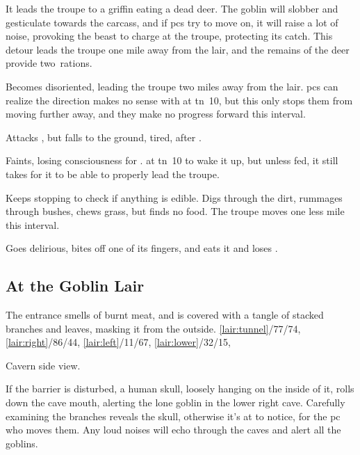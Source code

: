 \documentclass[10pt,twoside]{book}
\begin{document}
\begin{dlist}
  \item
  It leads the troupe to a griffin eating a dead deer.
  The goblin will slobber and gesticulate towards the carcass, and if \glspl{pc} try to move on, it will raise a lot of noise, provoking the beast to charge at the troupe, protecting its catch.
  This detour leads the troupe one mile away from the lair, and the remains of the deer provide two~\glspl{ration}.
  \item
  Becomes disoriented, leading the troupe two miles away from the lair.
  \glspl{pc} can realize the direction makes no sense with  at \gls{tn}~10, but this only stops them from moving further away, and they make no progress forward this \gls{interval}.
  \item
  Attacks , but falls to the ground, tired, after .
  \item
  Faints, losing consciousness for .
   at \gls{tn}~10 to wake it up, but unless fed, it still takes  for it to be able to properly lead the troupe.
  \item
  Keeps stopping to check if anything is edible.
  Digs through the dirt, rummages through bushes, chews grass, but finds no food.
  The troupe moves one less mile this \gls{interval}.
  \item
  Goes delirious, bites off one of its fingers, and eats it and loses .
\end{dlist}

\subsection{At the Goblin Lair}
The entrance smells of burnt meat, and is covered with a tangle of stacked branches and leaves, masking it from the outside.
%
  {%
    \ref{lair:tunnel}/77/74,
    \ref{lair:right}/86/44,
    \ref{lair:left}/11/67,
    \ref{lair:lower}/32/15,
  }%
{Cavern side view.\par\null}

If the barrier is disturbed, a human skull, loosely hanging on the inside of it, rolls down the cave mouth, alerting the lone goblin in the lower right cave.
Carefully examining the branches reveals the skull, otherwise it's  at \tn[8] to notice, for the \gls{pc} who moves them.
Any loud noises will echo through the caves and alert all the goblins.
\end{document}
